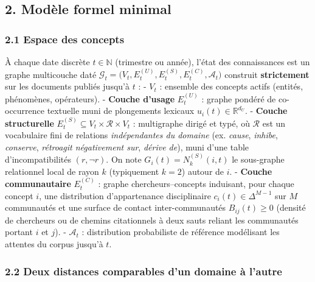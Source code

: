 \documentclass[a4paper,11pt]{article}
\begin{document}
\subsection*{2. Modèle formel minimal}

\subsubsection*{2.1 Espace des concepts}

À chaque date discrète \(t \in \mathbb{N}\) (trimestre ou année), l'état
des connaissances est un graphe multicouche daté
\(\mathcal{G}_t = \big(V_t, E_t^{(U)}, E_t^{(S)}, E_t^{(C)}, \mathcal{A}_t\big)\)
construit \textbf{strictement} sur les documents publiés jusqu'à \(t\) :
- \(V_t\) : ensemble des concepts actifs (entités, phénomènes,
opérateurs). - \textbf{Couche d'usage} \(E_t^{(U)}\) : graphe pondéré de
co-occurrence textuelle muni de plongements lexicaux
\(u_i(t) \in \mathbb{R}^{d_U}\). - \textbf{Couche structurelle}
\(E_t^{(S)} \subseteq V_t \times \mathcal{R} \times V_t\) : multigraphe
dirigé et typé, où \(\mathcal{R}\) est un vocabulaire fini de relations
\emph{indépendantes du domaine} (ex. \emph{cause}, \emph{inhibe},
\emph{conserve}, \emph{rétroagit négativement sur}, \emph{dérive de}),
muni d'une table d'incompatibilités \((r, \neg r)\). On note
\(G_i(t) = N_k^{(S)}(i,t)\) le sous-graphe relationnel local de rayon
\(k\) (typiquement \(k=2\)) autour de \(i\). - \textbf{Couche
communautaire} \(E_t^{(C)}\) : graphe chercheurs--concepts induisant,
pour chaque concept \(i\), une distribution d'appartenance disciplinaire
\(c_i(t) \in \Delta^{M-1}\) sur \(M\) communautés et une surface de
contact inter-communautés \(B_{ij}(t) \ge 0\) (densité de chercheurs ou
de chemins citationnels à deux sauts reliant les communautés portant
\(i\) et \(j\)). - \(\mathcal{A}_t\) : distribution probabiliste de
référence modélisant les attentes du corpus jusqu'à \(t\).

\subsubsection*{2.2 Deux distances comparables d'un domaine à l'autre}
\end{document}
